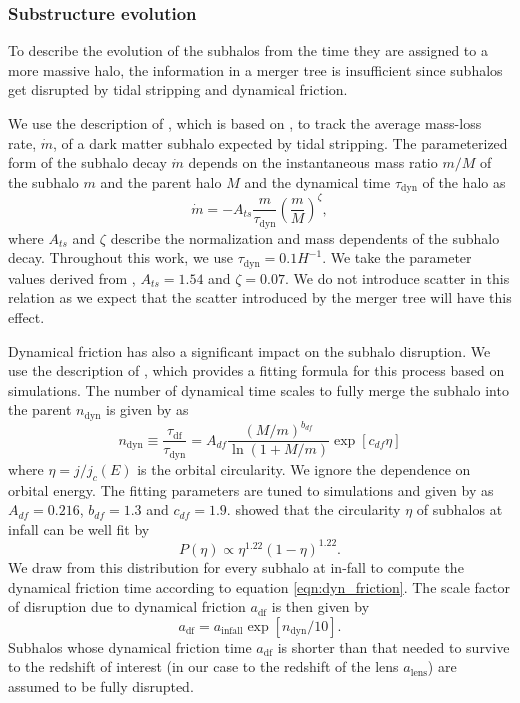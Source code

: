\documentclass[a4paper,11pt]{article}
\begin{document}
\subsubsection{Substructure evolution}
To describe the evolution of the subhalos from the time they are assigned to a more massive halo, the information in a merger tree is insufficient since subhalos get disrupted by tidal stripping and dynamical friction.

We use the description of \cite{Jiang:2016p14171}, which is based on \cite{vandenBosch:2005p14184}, to track the average mass-loss rate, $\dot{m}$, of a dark matter subhalo expected by tidal stripping. The parameterized form of the subhalo decay $\dot{m}$ depends on the instantaneous mass ratio $m/M$ of the subhalo $m$ and the parent halo $M$ and the dynamical time $\tau_{\text{dyn}}$ of the halo as
\begin{equation}
	\dot{m} = - A_{ts} \frac{m}{\tau_{\text{dyn}}}\left(\frac{m}{M}\right)^{\zeta},
\end{equation}
where $A_{ts}$ and $\zeta$ describe the normalization and mass dependents of the subhalo decay. Throughout this work, we use $\tau_{\text{dyn}}=0.1 H^{-1}$. We take the parameter values derived from \cite{Giocoli:2008p312}, $A_{ts}=1.54$ and $\zeta = 0.07$. We do not introduce scatter in this relation \citep[as done by][]{Jiang:2016p14171} as we expect that the scatter introduced by the merger tree will have this effect.


Dynamical friction has also a significant impact on the subhalo disruption. We use the description of \cite{BoylanKolchin:2008p28}, which provides a fitting formula for this process based on simulations. The number of dynamical time scales to fully merge the subhalo into the parent $n_{\text{dyn}}$ is given by \cite{BoylanKolchin:2008p28} as
\begin{equation} \label{eqn:dyn_friction}
	n_{\text{dyn}} \equiv \frac{\tau_{\text{df}}}{\tau_{\text{dyn}}} = A_{df} \frac{(M/m)^{b_{df}}}{\ln(1+M/m)}\exp[c_{df}\eta]
\end{equation}
where $\eta = j/j_c(E)$ is the orbital circularity. We ignore the dependence on orbital energy. The fitting parameters are tuned to simulations and given by \cite{BoylanKolchin:2008p28} as $A_{df}=0.216$, $b_{df}=1.3$ and $c_{df}=1.9$. \cite{Zentner:2005p290} showed that the circularity $\eta$ of subhalos at infall can be well fit by
\begin{equation} \label{eqn:orbital_circ}
	P(\eta) \propto \eta^{1.22}(1-\eta)^{1.22}.
\end{equation}
We draw from this distribution for every subhalo at in-fall to compute the dynamical friction time according to equation \ref{eqn:dyn_friction}. The scale factor of disruption due to dynamical friction $a_{\text{df}}$ is then given by
\begin{equation}
	a_{\text{df}} = a_{\text{infall}}\exp\left[n_{\text{dyn}}/10\right].
\end{equation}
Subhalos whose dynamical friction time $a_{\text{df}}$ is shorter than that needed to survive to the redshift of interest (in our case to the redshift of the lens $a_{\text{lens}}$) are assumed to be fully disrupted.
\end{document}
